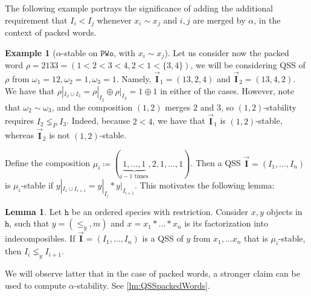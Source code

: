 \documentclass[12pt, reqno]{amsart}
\theoremstyle{definition}
\newtheorem{lm}[thm]{Lemma}
\newtheorem{smpl}[thm]{Example}
\newcommand{\III}{\vec{\mathbf{I}}}
\begin{document}
The following example portrays the significance of adding the additional requirement that $I_i < I_j$ whenever $x_i \sim x_j$ and $i, j$ are merged by $\alpha$, in the context of packed words.

\begin{smpl}[$\alpha$-stable on $\mathtt{PWo}$, with $x_i \sim x_j$]
Let us consider now the packed word $\rho = 2133 = (1 < 2 < 3 <4, 2 < 1 < \{3, 4\} )$, we will be considering QSS of $\rho$ from $\omega_1 = 12, \omega_2 = 1, \omega_3 = 1$.
Namely, $\III_1 = (13, 2, 4)$ and $\III_2 = (13, 4, 2)$.
We have that $\rho|_{I_2 \cup I_3} = \rho|_{I_2} \oplus \rho|_{I_3} = 1 \oplus 1$ in either of the cases.
However, note that $\omega_2 \sim \omega_3$, and the composition $(1, 2)$ merges $2$ and $3$, so $(1, 2)$-stability requires $I_2 \lneq_P I_3$.
Indeed, because $2 < 4$, we have that $\III_1$ is $(1, 2)$-stable, whereas $\III_2$ is not $(1, 2)$-stable.
\end{smpl}


Define the composition $\mu_i \coloneqq (\underbrace{1, \dots , 1}_\text{$i-1$ times}, 2, 1, \dots, 1)$.
Then a QSS $\III = (I_1, \dots, I_n)$ is $\mu_i$-stable if $y|_{I_1 \cup I_{i+1}} = y|_{I_i} \ast y|_{I_{i+1}}$.
This motivates the following lemma:

\begin{lm}\label{obs:pwords-characterisation}
Let $\mathtt{h}$ be an ordered species with restriction.
Consider $x, y$ objects in $\mathtt{h}$, such that $y = (\leq_y, m)$ and $x = x_1\ast \dots \ast x_n$ is its factorization into indecomposibles.
If $\III = (I_1, \dots, I_n)$ is a QSS of $y$ from $x_1, \dots x_n$ that is $\mu_i$-stable, then $I_i \lneq_y I_{i+1}$.
\end{lm}


We will observe latter that in the case of packed words, a stronger claim can be used to compute $\alpha$-stability.
See \cref{lm:QSSpackedWords}.
\end{document}
